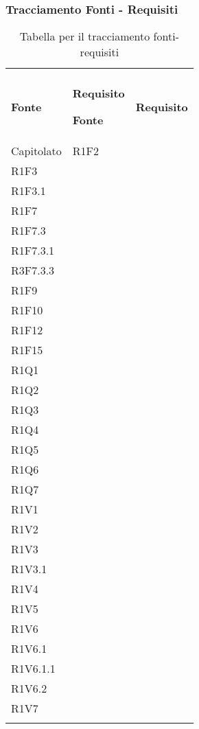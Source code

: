 \subsubsection{Tracciamento Fonti - Requisiti}

\renewcommand{\arraystretch}{2.2}

\begin{longtable}{|C{6.5cm}|C{6.5cm}|}

	\caption{Tabella per il tracciamento fonti-requisiti}\\
	\textbf{Fonte} & \textbf{Requisito}
	\endfirsthead
	
	\hline
	\textbf{Fonte} & \textbf{Requisito}
	\tabularnewline
	\endhead

	Capitolato &
	\centering
	R1F2\\
	R1F3 \\
	R1F3.1\\
	R1F7\\
	R1F7.3\\
	R1F7.3.1\\
	R3F7.3.3\\
	R1F9\\
	R1F10\\
	R1F12\\
	R1F15\\
	R1Q1\\
	R1Q2\\
	R1Q3\\
	R1Q4\\
	R1Q5\\
	R1Q6\\
	R1Q7\\
	R1V1\\
	R1V2\\
	R1V3\\
	R1V3.1\\
	R1V4\\
	R1V5\\
	R1V6\\
	R1V6.1\\
	R1V6.1.1\\
	R1V6.2\\
	R1V7\\

	\tabularnewline


\end{longtable}
